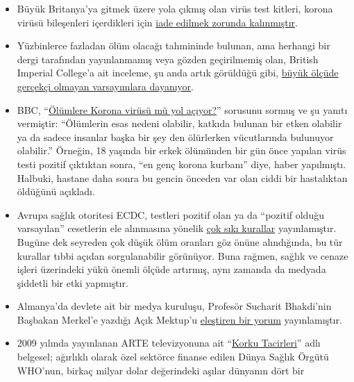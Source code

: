 \begin{itemize}
\tightlist
\item
  Büyük Britanya'ya gitmek üzere yola çıkmış olan virüs test kitleri,
  korona virüsü bileşenleri içerdikleri için
  \href{https://www.telegraph.co.uk/news/2020/03/30/uks-attempt-ramp-coronavirus-testing-hindered-key-components/}{iade
  edilmek zorunda kalınmıştır}.
\item
  Yüzbinlerce fazladan ölüm olacağı tahmininde bulunan, ama herhangi bir
  dergi tarafından yayınlanmamış veya gözden geçirilmemiş olan, British
  Imperial College'a ait inceleme, şu anda artık görüldüğü gibi,
  \href{https://judithcurry.com/2020/04/01/imperial-college-uk-covid-19-numbers-dont-seem-to-add-up/}{büyük
  ölçüde gerçekçi olmayan varsayımlara dayanıyor}.
\item
  BBC, ``\href{https://www.bbc.com/news/health-51979654}{Ölümlere Korona
  virüsü mü yol açıyor?}'' sorusunu sormuş ve şu yanıtı vermiştir:
  ``Ölümlerin esas nedeni olabilir, katkıda bulunan bir etken olabilir
  ya da sadece insanlar başka bir şey den ölürlerken vücutlarında
  bulunuyor olabilir.'' Örneğin, 18 yaşında bir erkek ölümünden bir gün
  önce yapılan virüs testi pozitif çıktıktan sonra, ``en genç korona
  kurbanı'' diye, haber yapılmıştı. Halbuki, hastane daha sonra bu
  gencin önceden var olan ciddi bir hastalıktan öldüğünü açıkladı.
\item
  Avrupa sağlık otoritesi ECDC, testleri pozitif olan ya da ``pozitif
  olduğu varsayılan'' cesetlerin ele alınmasına yönelik
  \href{https://www.ecdc.europa.eu/sites/default/files/documents/COVID-19-safe-handling-of-bodies-or-persons-dying-from-COVID19.pdf}{çok
  sıkı kurallar} yayınlamıştır. Bugüne dek seyreden çok düşük ölüm
  oranları göz önüne alındığında, bu tür kurallar tıbbi açıdan
  sorgulanabilir görünüyor. Buna rağmen, sağlık ve cenaze işleri
  üzerindeki yükü önemli ölçüde artırmış, aynı zamanda da medyada
  şiddetli bir etki yapmıştır.
\item
  Almanya'da devlete ait bir medya kuruluşu, Profesör Sucharit
  Bhakdi'nin Başbakan Merkel'e yazdığı Açık Mektup'u
  \href{https://www.br.de/nachrichten/wissen/bhakdis-brief-an-die-kanzlerin-was-ist-dran-an-seinen-fragen,RutYDhd}{eleştiren
  bir yorum} yayınlamıştır.
\item
  2009 yılında yayınlanan ARTE televizyonuna ait
  ``\href{https://vimeo.com/403175258}{Korku Tacirleri}'' adlı belgesel;
  ağırlıklı olarak özel sektörce finanse edilen Dünya Sağlık Örgütü
  WHO'nun, birkaç milyar dolar değerindeki aşılar dünyanın dört bir

\end{itemize}
